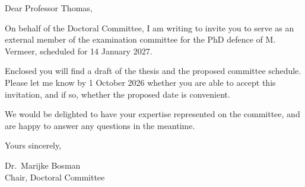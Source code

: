 \documentclass[11pt]{article}
\date{\today}
\begin{document}
\begin{letterhead}
\par\bigskip\noindent
Dear Professor Thomas,

On behalf of the Doctoral Committee, I am writing to invite you to
serve as an external member of the examination committee for the PhD
defence of M. Vermeer, scheduled for 14 January 2027.

Enclosed you will find a draft of the thesis and the proposed
committee schedule. Please let me know by 1 October 2026 whether you
are able to accept this invitation, and if so, whether the proposed
date is convenient.

We would be delighted to have your expertise represented on the
committee, and are happy to answer any questions in the meantime.

\bigskip
Yours sincerely,

\bigskip
Dr.\ Marijke Bosman\\
Chair, Doctoral Committee
\end{letterhead}
\end{document}
